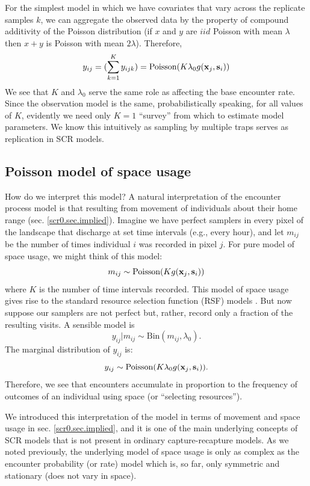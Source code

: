 For the simplest model in which we have covariates that vary across
the replicate samples $k$, we can aggregate the observed data by the
property of compound additivity of the Poisson distribution (if $x$ and
$y$ are $iid$ Poisson with mean $\lambda$ then $x+y$ is Poisson with
mean $2\lambda$). Therefore,
\[
y_{ij} = (\sum_{k=1}^{K} y_{ijk}) =  \mbox{Poisson}(K  \lambda_{0}
g({\bf x}_{j},{\bf s}_{i}) )
\]
We see that $K$ and $\lambda_{0}$ serve the same role as affecting the
base encounter rate. Since the observation model is the same,
probabilistically speaking, for all values of $K$, evidently we need
only $K=1$ ``survey'' from which to estimate model parameters. We know
this intuitively as sampling by multiple traps serves as replication
in SCR models.

\subsection{Poisson model of space usage}

How do we interpret this model?  A natural interpretation of the
encounter process model is that resulting from movement of individuals
about their home range (sec. \ref{scr0.sec.implied}).  Imagine we have
perfect samplers in every pixel of the landscape that discharge at set
time intervals (e.g., every hour), and let $m_{ij}$ be the number of
times individual $i$ was recorded in pixel $j$. For pure model of
space usage, we might think of this model:
\[
m_{ij} \sim  \mbox{Poisson}(K  g({\bf x}_{j},{\bf s}_{i}) )
\]
where $K$ is the number of time intervals recorded. This model of
space usage gives rise to the standard resource selection function
(RSF) models \citep[][and Chapt. \ref{chapt.rsf}]{royle_etal:2012mee}.
But now suppose our samplers are not perfect but, rather, record only
a fraction of the resulting visits. A sensible model is
\[
 y_{ij}|m_{ij} \sim \mbox{Bin}(m_{ij}, \lambda_{0}).
\]
The marginal distribution of $y_{ij}$ is:
\[
 y_{ij} \sim \mbox{Poisson}(K \lambda_{0} g({\bf x}_{j},{\bf s}_{i}) ).
\]
Therefore, we see that encounters accumulate in proportion to the
frequency of outcomes of an individual using space (or ``selecting
resources'').

We introduced this interpretation of the model in terms of movement
and space usage in sec. \ref{scr0.sec.implied}, and it is one of the
main underlying concepts of SCR models that is not present in ordinary
capture-recapture models. As we noted previously, the underlying model
of space usage is only as complex as the encounter probability (or
rate) model which is, so far, only symmetric and stationary (does not
vary in space). 





